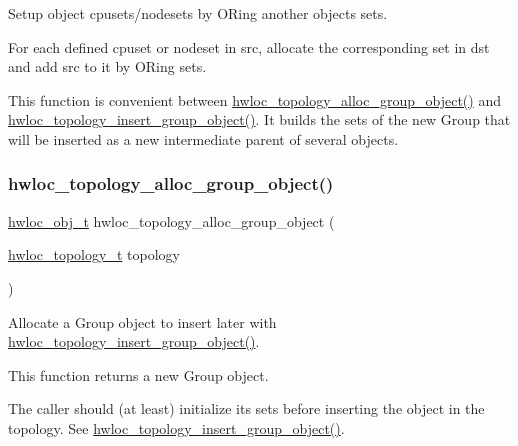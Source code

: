 Setup object cpusets/nodesets by OR\textquotesingle{}ing another object\textquotesingle{}s sets. 

For each defined cpuset or nodeset in {\ttfamily src}, allocate the corresponding set in {\ttfamily dst} and add {\ttfamily src} to it by OR\textquotesingle{}ing sets.

This function is convenient between \hyperlink{a00194_ga4cea4741165faf5323931a9ed8786ef7}{hwloc\+\_\+topology\+\_\+alloc\+\_\+group\+\_\+object()} and \hyperlink{a00194_ga1fc6012b3e1c249b83f48cb7bcacaa5b}{hwloc\+\_\+topology\+\_\+insert\+\_\+group\+\_\+object()}. It builds the sets of the new Group that will be inserted as a new intermediate parent of several objects. \mbox{\label{a00194_ga4cea4741165faf5323931a9ed8786ef7}} 
\subsubsection{\texorpdfstring{hwloc\+\_\+topology\+\_\+alloc\+\_\+group\+\_\+object()}{hwloc\_topology\_alloc\_group\_object()}}
{\footnotesize\ttfamily \hyperlink{a00185_ga79b8ab56877ef99ac59b833203391c7d}{hwloc\+\_\+obj\+\_\+t} hwloc\+\_\+topology\+\_\+alloc\+\_\+group\+\_\+object (\begin{DoxyParamCaption}\item[{\hyperlink{a00186_ga9d1e76ee15a7dee158b786c30b6a6e38}{hwloc\+\_\+topology\+\_\+t}}]{topology }\end{DoxyParamCaption})}



Allocate a Group object to insert later with \hyperlink{a00194_ga1fc6012b3e1c249b83f48cb7bcacaa5b}{hwloc\+\_\+topology\+\_\+insert\+\_\+group\+\_\+object()}. 

This function returns a new Group object.

The caller should (at least) initialize its sets before inserting the object in the topology. See \hyperlink{a00194_ga1fc6012b3e1c249b83f48cb7bcacaa5b}{hwloc\+\_\+topology\+\_\+insert\+\_\+group\+\_\+object()}. \mbox{\label{a00194_gaf955b190c0299dcfb5bc985d777f92a1}} 
